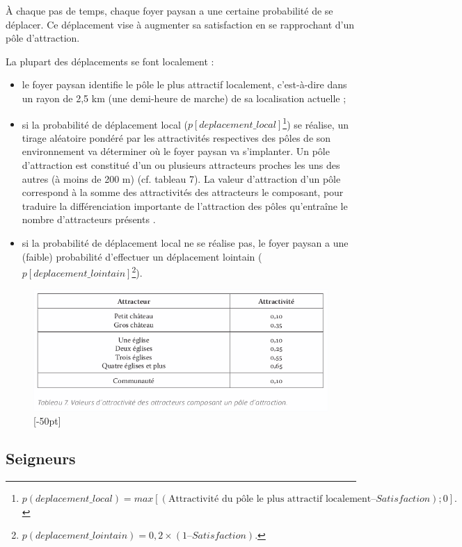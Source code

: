 À chaque pas de temps, chaque foyer paysan a une certaine probabilité de se déplacer.
Ce déplacement vise à augmenter sa satisfaction en se rapprochant d'un pôle d'attraction.

La plupart des déplacements se font localement :
\begin{itemize}
	\item le foyer paysan identifie le pôle le plus attractif localement, c'est-à-dire dans un rayon de 2,5 km (une demi-heure de marche) de sa localisation actuelle ;
	\item si la probabilité de déplacement local ($p[deplacement\_local]$\footnote{
		$p(deplacement\_local) = max[(\text{Attractivité du pôle le plus attractif localement} – Satisfaction) ; 0].$	
	}) se réalise, un tirage aléatoire pondéré par les attractivités respectives des pôles de son environnement va déterminer où le foyer paysan va s'implanter.
	Un pôle d'attraction est constitué d'un ou plusieurs attracteurs proches les uns des autres (à moins de 200 m) (cf. tableau 7).
	La valeur d'attraction d'un pôle correspond à la somme des attractivités des attracteurs le composant, pour traduire la différenciation importante de l'attraction des pôles qu'entraîne le nombre d'attracteurs présents \autocite[tableau 13, p. 96]{zadora-rio_paroisses_2008}.
	\item si la probabilité de déplacement local ne se réalise pas, le foyer paysan a une (faible) probabilité d'effectuer un déplacement lointain ($p[deplacement\_lointain]$\footnote{
		$p(deplacement\_lointain) = 0,2 × (1 – Satisfaction)$.
	}).
\end{itemize}

\begin{figure}[H]
	\centering
	\includegraphics[width=1\linewidth]{src/Chapitre_TMD/Tab7.png}
	[-50pt]
\end{figure}

\clearpage
\subsection{Seigneurs}

